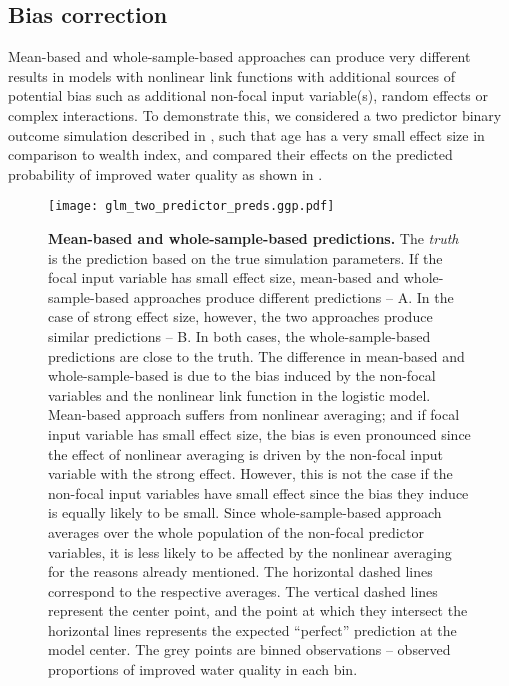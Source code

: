 \subsection{Bias correction}

Mean-based and whole-sample-based approaches can produce very different results in models with nonlinear link functions with additional sources of potential bias such as additional non-focal input variable(s), random effects or complex interactions. To demonstrate this, we considered a two predictor binary outcome simulation described in , such that age has a very small effect size in comparison to wealth index, and compared their effects on the predicted probability of improved water quality as shown in . 

\begin{figure}
\begin{center}
\texttt{[image: glm\_two\_predictor\_preds.ggp.pdf]}
\end{center}
\caption{{\bf Mean-based and whole-sample-based predictions.} The \emph{truth} is the prediction based on the true simulation parameters. If the focal input variable has small effect size, mean-based and whole-sample-based approaches produce different predictions -- A. In the case of strong effect size, however, the two approaches produce similar predictions -- B. In both cases, the whole-sample-based predictions are close to the truth. The difference in mean-based and whole-sample-based is due to the bias induced by the non-focal variables and the nonlinear link function in the logistic model. Mean-based approach suffers from nonlinear averaging; and if focal input variable has small effect size, the bias is even pronounced since the effect of nonlinear averaging is driven by the non-focal input variable with the strong effect. However, this is not the case if the non-focal input variables have small effect since the bias they induce is equally likely to be small. Since whole-sample-based approach averages over the whole population of the non-focal predictor variables, it is less likely to be affected by the nonlinear averaging for the reasons already mentioned. The horizontal dashed lines correspond to the respective averages. The vertical dashed lines represent the center point, and the point at which they intersect the horizontal lines represents the expected ``perfect'' prediction at the model center. The grey points are binned observations -- observed proportions of improved water quality in each bin.} 
\label{fig:pred_bin_plots}
\end{figure}


